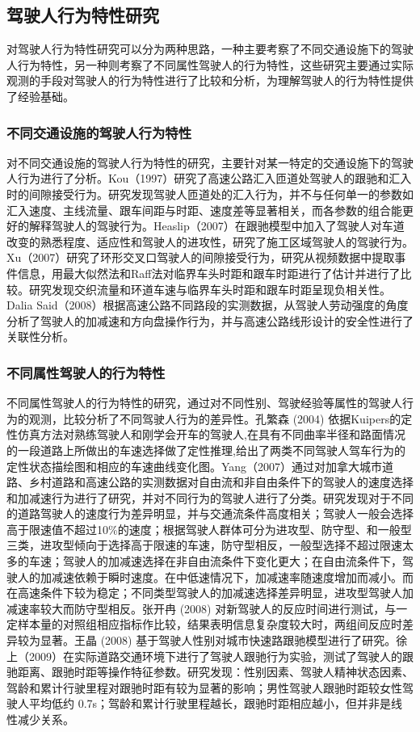 \subsection{驾驶人行为特性研究}
对驾驶人行为特性研究可以分为两种思路，一种主要考察了不同交通设施下的驾驶人行为特性，另一种则考察了不同属性驾驶人的行为特性，这些研究主要通过实际观测的手段对驾驶人的行为特性进行了比较和分析，为理解驾驶人的行为特性提供了经验基础。

\subsubsection{不同交通设施的驾驶人行为特性}
对不同交通设施的驾驶人行为特性的研究，主要针对某一特定的交通设施下的驾驶人行为进行了分析。Kou（1997）研究了高速公路汇入匝道处驾驶人的跟驰和汇入时的间隙接受行为。研究发现驾驶人匝道处的汇入行为，并不与任何单一的参数如汇入速度、主线流量、跟车间距与时距、速度差等显著相关，而各参数的组合能更好的解释驾驶人的驾驶行为\cite{Kou1997}。Heaslip（2007）在跟驰模型中加入了驾驶人对车道改变的熟悉程度、适应性和驾驶人的进攻性，研究了施工区域驾驶人的驾驶行为\cite{Heaslip2007}。Xu（2007）研究了环形交叉口驾驶人的间隙接受行为，研究从视频数据中提取事件信息，用最大似然法和Raff法对临界车头时距和跟车时距进行了估计并进行了比较。研究发现交织流量和环道车速与临界车头时距和跟车时距呈现负相关性\cite{Xu2007}。Dalia Said（2008）根据高速公路不同路段的实测数据，从驾驶人劳动强度的角度分析了驾驶人的加减速和方向盘操作行为，并与高速公路线形设计的安全性进行了关联性分析\cite{Said2008}。

\subsubsection{不同属性驾驶人的行为特性}
不同属性驾驶人的行为特性的研究，通过对不同性别、驾驶经验等属性的驾驶人行为的观测，比较分析了不同驾驶人行为的差异性。孔繁森 (2004) 依据Kuipers的定性仿真方法对熟练驾驶人和刚学会开车的驾驶人,在具有不同曲率半径和路面情况的一段道路上所做出的车速选择做了定性推理,给出了两类不同驾驶人驾车行为的定性状态描绘图和相应的车速曲线变化图\cite{孔繁森2004}。Yang（2007）通过对加拿大城市道路、乡村道路和高速公路的实测数据对自由流和非自由条件下的驾驶人的速度选择和加减速行为进行了研究，并对不同行为的驾驶人进行了分类。研究发现对于不同的道路驾驶人的速度行为差异明显，并与交通流条件高度相关；驾驶人一般会选择高于限速值不超过10\%的速度；根据驾驶人群体可分为进攻型、防守型、和一般型三类，进攻型倾向于选择高于限速的车速，防守型相反，一般型选择不超过限速太多的车速；驾驶人的加减速选择在非自由流条件下变化更大；在自由流条件下，驾驶人的加减速依赖于瞬时速度。在中低速情况下，加减速率随速度增加而减小。而在高速条件下较为稳定；不同类型驾驶人的加减速选择差异明显，进攻型驾驶人加减速率较大而防守型相反\cite{Yang2008}。张开冉 (2008) 对新驾驶人的反应时间进行测试，与一定样本量的对照组相应指标作比较，结果表明信息复杂度较大时，两组间反应时差异较为显著\cite{张开冉2008}。王晶 (2008) 基于驾驶人性别对城市快速路跟驰模型进行了研究\cite{王晶2008}。徐上（2009）在实际道路交通环境下进行了驾驶人跟驰行为实验，测试了驾驶人的跟驰距离、跟驰时距等操作特征参数。研究发现：性别因素、驾驶人精神状态因素、驾龄和累计行驶里程对跟驰时距有较为显著的影响；男性驾驶人跟驰时距较女性驾驶人平均低约 0.7s；驾龄和累计行驶里程越长，跟驰时距相应越小，但并非是线性减少关系\cite{徐上2009}。

